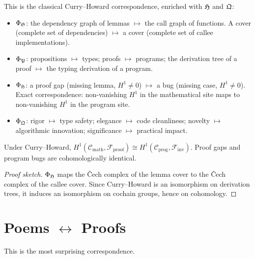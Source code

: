 \begin{construction}
\label{con:math-prog}
This is the classical Curry--Howard correspondence, enriched with
$\mathfrak{H}$ and $\mathfrak{Q}$:
\begin{itemize}[nosep]
  \item $\Phi_{\mathfrak{S}}$: the dependency graph of lemmas $\mapsto$
    the call graph of functions.  A cover (complete set of
    dependencies) $\mapsto$ a cover (complete set of callee
    implementations).
  \item $\Phi_{\mathfrak{P}}$: propositions $\mapsto$ types;
    proofs $\mapsto$ programs; the derivation tree of a proof
    $\mapsto$ the typing derivation of a program.
  \item $\Phi_{\mathfrak{H}}$: a proof gap (missing lemma, $H^1\neq 0$)
    $\mapsto$ a bug (missing case, $H^1\neq 0$).
    Exact correspondence: non-vanishing $H^1$ in the mathematical
    site maps to non-vanishing $H^1$ in the program site.
  \item $\Phi_{\mathfrak{Q}}$: rigor $\mapsto$ type safety;
    elegance $\mapsto$ code cleanliness;
    novelty $\mapsto$ algorithmic innovation;
    significance $\mapsto$ practical impact.
\end{itemize}
\end{construction}

\begin{theorem}
\label{thm:ch-cspec}
Under Curry--Howard,
$H^1(\mathcal{C}_{\mathrm{math}},\mathcal{F}_{\mathrm{proof}})
\cong
H^1(\mathcal{C}_{\mathrm{prog}},\mathcal{F}_{\mathrm{inv}})$.
Proof gaps and program bugs are cohomologically identical.
\end{theorem}

\begin{proof}[Proof sketch]
$\Phi_{\mathfrak{H}}$ maps the \v{C}ech complex of the lemma cover to
the \v{C}ech complex of the callee cover.  Since Curry--Howard
is an isomorphism on derivation trees, it induces an isomorphism
on cochain groups, hence on cohomology.
\end{proof}

\section{Poems $\leftrightarrow$ Proofs}
\label{sec:poet-math}

This is the most surprising correspondence.

